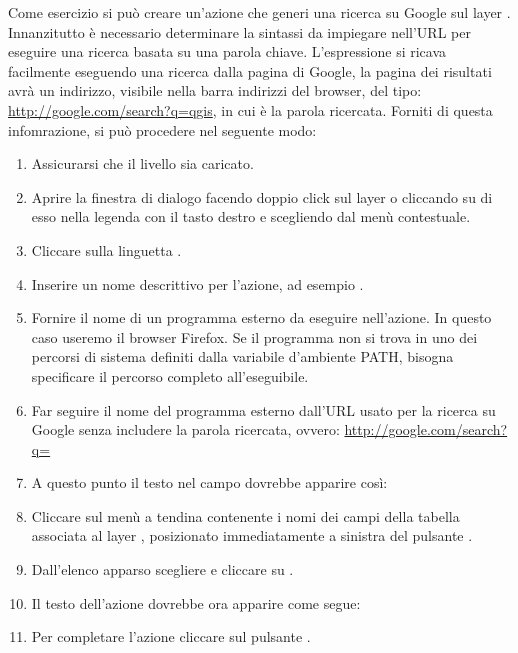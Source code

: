Come esercizio si può creare un'azione che generi una ricerca su Google sul
layer . Innanzitutto è necessario determinare la sintassi da
impiegare nell'URL per eseguire una ricerca basata su una parola chiave.
L'espressione si ricava facilmente eseguendo una ricerca dalla pagina di
Google, la pagina dei risultati avrà un indirizzo, visibile nella barra
indirizzi del browser, del tipo: \url{http://google.com/search?q=qgis},
in cui  è la parola ricercata. Forniti di questa infomrazione,
si può procedere nel seguente modo:

\begin{enumerate}
\item Assicurarsi che il livello  sia caricato.
\item Aprire la finestra di dialogo  facendo
doppio click sul layer o cliccando su di esso nella legenda con il tasto
destro e scegliendo   dal menù contestuale.
\item Cliccare sulla linguetta .
\item Inserire un nome descrittivo per l'azione, ad esempio .
\item Fornire il nome di un programma esterno da eseguire nell'azione. In
questo caso useremo il browser Firefox. Se il programma non si trova in uno
dei percorsi di sistema definiti dalla variabile d'ambiente PATH, bisogna
specificare il percorso completo all'eseguibile.
\item Far seguire il nome del programma esterno dall'URL usato per la ricerca
su Google senza includere la parola ricercata, ovvero:
  \url{http://google.com/search?q=}
\item A questo punto il testo nel campo  dovrebbe apparire
così:\\
\item Cliccare sul menù a tendina contenente i nomi dei campi della tabella
associata al layer , posizionato immediatamente a sinistra del
pulsante .
\item Dall'elenco apparso scegliere  e cliccare su .
\item Il testo dell'azione dovrebbe ora apparire come segue:\\ 
\item Per completare l'azione cliccare sul pulsante .
\end{enumerate}
 
